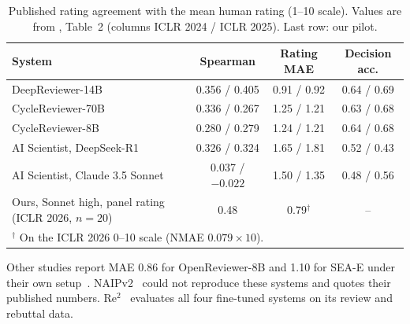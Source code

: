 \documentclass[11pt,a4paper]{article}
\begin{document}
\begin{table}[t]
\centering\small
\caption{Published rating agreement with the mean human rating (1--10 scale). Values are from
\citet{zhu2025deepreview}, Table~2 (columns ICLR 2024 / ICLR 2025). Last row: our pilot.}
\label{tab:sys}
\begin{tabular}{lccc}
\toprule
System & Spearman & Rating MAE & Decision acc.\\
\midrule
DeepReviewer-14B~\citep{zhu2025deepreview} & 0.356 / 0.405 & 0.91 / 0.92 & 0.64 / 0.69\\
CycleReviewer-70B~\citep{weng2025cycleresearcher} & 0.336 / 0.267 & 1.25 / 1.21 & 0.63 / 0.68\\
CycleReviewer-8B~\citep{weng2025cycleresearcher} & 0.280 / 0.279 & 1.24 / 1.21 & 0.64 / 0.68\\
AI Scientist, DeepSeek-R1~\citep{lu2024aiscientist} & 0.326 / 0.324 & 1.65 / 1.81 & 0.52 / 0.43\\
AI Scientist, Claude 3.5 Sonnet~\citep{lu2024aiscientist} & 0.037 / $-0.022$ & 1.50 / 1.35 & 0.48 / 0.56\\
\midrule
Ours, Sonnet high, panel rating (ICLR 2026, $n=20$) & 0.48 & 0.79$^\dagger$ & --\\
\bottomrule
\multicolumn{4}{l}{\footnotesize $^\dagger$ On the ICLR 2026 0--10 scale (NMAE $0.079\times10$).}
\end{tabular}
\end{table}

Other studies report MAE 0.86 for OpenReviewer-8B and 1.10 for SEA-E under their own
setup~\citep{li2026beyondrating}. NAIPv2~\citep{zhao2025naipv2} could not reproduce these
systems and quotes their published numbers. Re$^2$~\citep{zhang2025re2} evaluates all four
fine-tuned systems on its review and rebuttal data.
\end{document}
